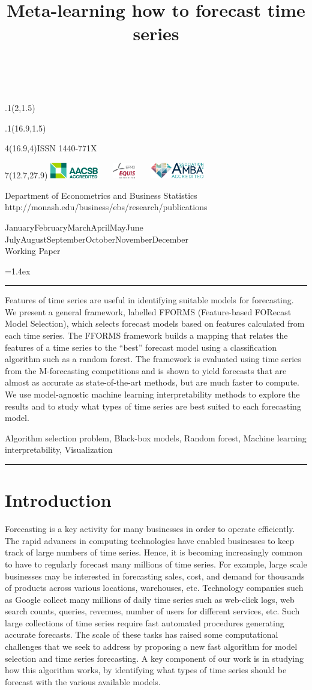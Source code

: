 \documentclass[11pt,a4paper,]{article}
\title{Meta-learning how to forecast time series}
\date{\sf\Date~\Month~\Year}
\makeatletter
\def\Date{\number\day}
\def\Month{\ifcase\month\or
 January\or February\or March\or April\or May\or June\or
 July\or August\or September\or October\or November\or December\fi}
\def\Year{\number\year}
\def\showjel{{\large\textsf{\textbf{JEL classification:}}~\@jel}}
\def\cover{{\sffamily\setcounter{page}{0}
        \thispagestyle{empty}
        \placefig{2}{1.5}{width=5cm}{monash2}
        \placefig{16.9}{1.5}{width=2.1cm}{MBusSchool}
        \begin{textblock}{4}(16.9,4)ISSN 1440-771X\end{textblock}
        \begin{textblock}{7}(12.7,27.9)\hfill
        \includegraphics[height=0.7cm]{AACSB}~~~
        \includegraphics[height=0.7cm]{EQUIS}~~~
        \includegraphics[height=0.7cm]{AMBA}
        \end{textblock}
        \vspace*{2cm}
        \begin{center}\Large
        Department of Econometrics and Business Statistics\\[.5cm]
        \footnotesize http://monash.edu/business/ebs/research/publications
        \end{center}\vspace{2cm}
        \begin{center}
        \fbox{\parbox{14cm}{\begin{onehalfspace}\centering\Huge\vspace*{0.3cm}
                \textsf{\textbf{\expandafter{\@title}}}\vspace{1cm}\par
                \LARGE\@author\end{onehalfspace}
        }}
        \end{center}
        \vfill
                \begin{center}\Large
                \Month~\Year\\[1cm]
                Working Paper \@wp
        \end{center}\vspace*{2cm}}}
\def\pageone{{\sffamily\setstretch{1}%
        \thispagestyle{empty}%
        \vbox to \textheight{%
        \raggedright\baselineskip=1.2cm
     {\fontsize{24.88}{30}\sffamily\textbf{\expandafter{\@title}}}
        \vspace{2cm}\par
        \hspace{1cm}\parbox{14cm}{\sffamily\large\@addresses}\vspace{1cm}\vfill
        \hspace{1cm}{\large\Date~\Month~\Year}\\[1cm]
        \hspace{1cm}\showjel\vss}}}
\def\blindtitle{{\sffamily
     \thispagestyle{plain}\raggedright\baselineskip=1.2cm
     {\fontsize{24.88}{30}\sffamily\textbf{\expandafter{\@title}}}\vspace{1cm}\par
        }}
\def\titlepage{{\cover\newpage\pageone\newpage\blindtitle}}
\let\maketitle\titlepage
\newenvironment{keywords}{\par\vspace{0.5cm}\noindent{\sffamily\textbf{Keywords:}}}{\vspace{0.25cm}\par\hrule\vspace{0.5cm}\par}
\renewenvironment{abstract}{\begin{minipage}{\textwidth}\parskip=1.4ex\noindent
\hrule\vspace{0.1cm}\par{\sffamily\textbf{\abstractname}}\newline}
  {\end{minipage}}
\def\placefig#1#2#3#4{\begin{textblock}{.1}(#1,#2)\rlap{\texttt{[image: \#4]}}\end{textblock}}
\makeatother
\begin{document}
\maketitle
\begin{abstract}
Features of time series are useful in identifying suitable models for forecasting. We present a general framework, labelled FFORMS (Feature-based FORecast Model Selection), which selects forecast models based on features calculated from each time series. The FFORMS framework builds a mapping that relates the features of a time series to the ``best'' forecast model using a classification algorithm such as a random forest. The framework is evaluated using time series from the M-forecasting competitions and is shown to yield forecasts that are almost as accurate as state-of-the-art methods, but are much faster to compute. We use model-agnostic machine learning interpretability methods to explore the results and to study what types of time series are best suited to each forecasting model.
\end{abstract}
\begin{keywords}
Algorithm selection problem, Black-box models, Random forest, Machine learning interpretability, Visualization
\end{keywords}

\hypertarget{introduction}{%
\section{Introduction}\label{introduction}}

Forecasting is a key activity for many businesses in order to operate efficiently. The rapid advances in computing technologies have enabled businesses to keep track of large numbers of time series. Hence, it is becoming increasingly common to have to regularly forecast many millions of time series. For example, large scale businesses may be interested in forecasting sales, cost, and demand for thousands of products across various locations, warehouses, etc. Technology companies such as Google collect many millions of daily time series such as web-click logs, web search counts, queries, revenues, number of users for different services, etc. Such large collections of time series require fast automated procedures generating accurate forecasts. The scale of these tasks has raised some computational challenges that we seek to address by proposing a new fast algorithm for model selection and time series forecasting. A key component of our work is in studying how this algorithm works, by identifying what types of time series should be forecast with the various available models.
\end{document}
